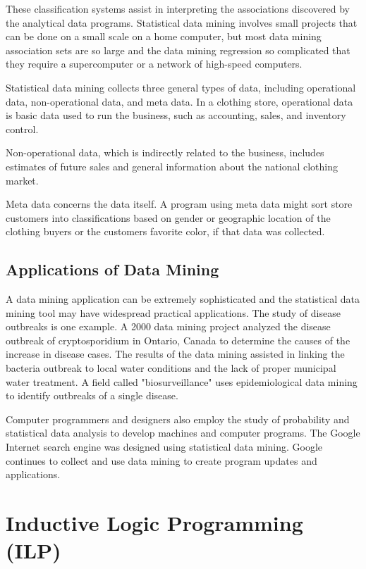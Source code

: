 \documentclass[11pt]{article} %
\begin{document}
These classification systems assist in interpreting the associations discovered by the analytical data programs. Statistical data mining involves small projects that can be done on a small scale on a home computer, but most data mining association sets are so large and the data mining regression so complicated that they require a supercomputer or a network of high-speed computers.


Statistical data mining collects three general types of data, including operational data, non-operational data, and meta data. In a clothing store, operational data is basic data used to run the business, such as accounting, sales, and inventory control. 


Non-operational data, which is indirectly related to the business, includes estimates of future sales and general information about the national clothing market. 


Meta data concerns the data itself. A program using meta data might sort store customers into classifications based on gender or geographic location of the clothing buyers or the customers favorite color, if that data was collected.


\subsection{Applications of Data Mining}

A data mining application can be extremely sophisticated and the statistical data mining tool may have widespread practical applications. The study of disease outbreaks is one example. A 2000 data mining project analyzed the disease outbreak of cryptosporidium in Ontario, Canada to determine the causes of the increase in disease cases. The results of the data mining assisted in linking the bacteria outbreak to local water conditions and the lack of proper municipal water treatment. A field called "biosurveillance" uses epidemiological data mining to identify outbreaks of a single disease.


Computer programmers and designers also employ the study of probability and statistical data analysis to develop machines and computer programs. The Google Internet search engine was designed using statistical data mining. Google continues to collect and use data mining to create program updates and applications.



\section{Inductive Logic Programming (ILP)}
\end{document}
